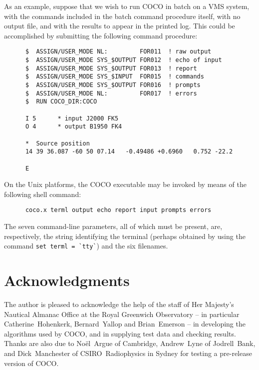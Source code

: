 As an example, suppose that we wish to run COCO in batch on a VMS
system, with
the commands included in the batch command procedure itself,
with no output file, and with the results to appear in the
printed log.
This could be accomplished by submitting the following command procedure:
\begin{verbatim}
      $  ASSIGN/USER_MODE NL:         FOR011  ! raw output
      $  ASSIGN/USER_MODE SYS_$OUTPUT FOR012  ! echo of input
      $  ASSIGN/USER_MODE SYS_$OUTPUT FOR013  ! report
      $  ASSIGN/USER_MODE SYS_$INPUT  FOR015  ! commands
      $  ASSIGN/USER_MODE SYS_$OUTPUT FOR016  ! prompts
      $  ASSIGN/USER_MODE NL:         FOR017  ! errors
      $  RUN COCO_DIR:COCO

      I 5      * input J2000 FK5
      O 4      * output B1950 FK4

      *  Source position
      14 39 36.087 -60 50 07.14   -0.49486 +0.6960   0.752 -22.2

      E
\end{verbatim}

On the Unix platforms, the COCO executable may be invoked by means of
the following shell command:

\begin{verbatim}
      coco.x terml output echo report input prompts errors
\end{verbatim}

The seven command-line parameters, all of which must be present,
are, respectively, the string identifying the terminal (perhaps
obtained by using the command \verb|set terml = `tty`|) and the
six filenames.

\section{Acknowledgments}

The author is pleased to acknowledge the help of the staff of Her Majesty's
Nautical Almanac Office at the Royal Greenwich
Observatory -- in particular Catherine~Hohenkerk,
Bernard~Yallop and Brian~Emerson -- in developing the algorithms used by
COCO, and in supplying test data and checking results.
Thanks are also due to No\"{e}l~Argue of Cambridge, Andrew~Lyne of Jodrell~Bank,
and Dick~Manchester of CSIRO~Radiophysics in
Sydney for testing a pre-release version of COCO.



